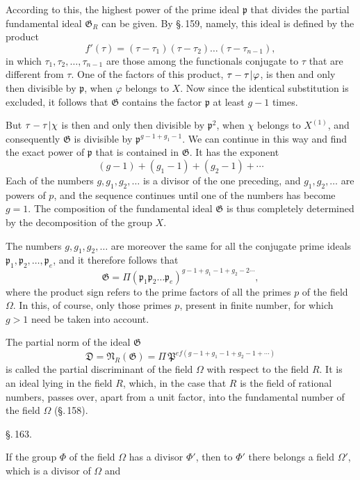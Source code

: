 According to this, the highest power of the prime ideal $\mathfrak{p}$ that divides the partial fundamental ideal $\mathfrak{G}_R$ can be given. By \S.\,159, namely, this ideal is defined by the product
\[ f'(\tau) = (\tau - \tau_1)(\tau - \tau_2)\ldots(\tau - \tau_{n-1}), \]
in which $\tau_1, \tau_2, \ldots, \tau_{n-1}$ are those among the functionals conjugate to $\tau$ that are different from $\tau$. One of the factors of this product, $\tau - \tau\mkern1mu|\mkern1mu\varphi$, is then and only then divisible by $\mathfrak{p}$, when $\varphi$ belongs to $X$. Now since the identical substitution is excluded, it follows that $\mathfrak{G}$ contains the factor $\mathfrak{p}$ at least $g-1$ times.

But $\tau - \tau\mkern1mu|\mkern1mu\chi$ is then and only then divisible by $\mathfrak{p}^2$, when $\chi$ belongs to $X^{(1)}$, and consequently $\mathfrak{G}$ is divisible by $\mathfrak{p}^{g-1+g_1-1}$. We can continue in this way and find the exact power of $\mathfrak{p}$ that is contained in $\mathfrak{G}$. It has the exponent
\[ (g-1) + (g_1-1) + (g_2-1) + \cdots \]
Each of the numbers $g, g_1, g_2, \ldots$ is a divisor of the one preceding, and $g_1, g_2, \ldots$ are powers of $p$, and the sequence continues until one of the numbers has become $g = 1$. The composition of the fundamental ideal $\mathfrak{G}$ is thus completely determined by the decomposition of the group $X$.

The numbers $g, g_1, g_2, \ldots$ are moreover the same for all the conjugate prime ideals $\mathfrak{p}_1, \mathfrak{p}_2, \ldots, \mathfrak{p}_e$, and it therefore follows that
\[ \mathfrak{G} = \Pi(\mathfrak{p}_1\mathfrak{p}_2\ldots\mathfrak{p}_e)^{g-1+g_1-1+g_2-2\cdots}, \] %
where the product sign refers to the prime factors of all the primes $p$ of the field $\Omega$. In this, of course, only those primes $p$, present in finite number, for which $g > 1$ need be taken into account.

The partial norm of the ideal $\mathfrak{G}$
\[ \mathfrak{D} = \mathfrak{N}_R(\mathfrak{G}) = \Pi\, \mathfrak{P}^{ef(g-1+g_1-1+g_2-1+\cdots)} \]
is called the partial discriminant of the field $\Omega$ with respect to the field $R$. It is an ideal lying in the field $R$, which, in the case that $R$ is the field of rational numbers, passes over, apart from a unit factor, into the fundamental number of the field $\Omega$ (\S.\,158).

\begin{center}
\S.\,163.

\end{center}

If the group $\Phi$ of the field $\Omega$ has a divisor $\Phi'$, then to $\Phi'$ there belongs a field $\Omega'$, which is a divisor of $\Omega$ and
